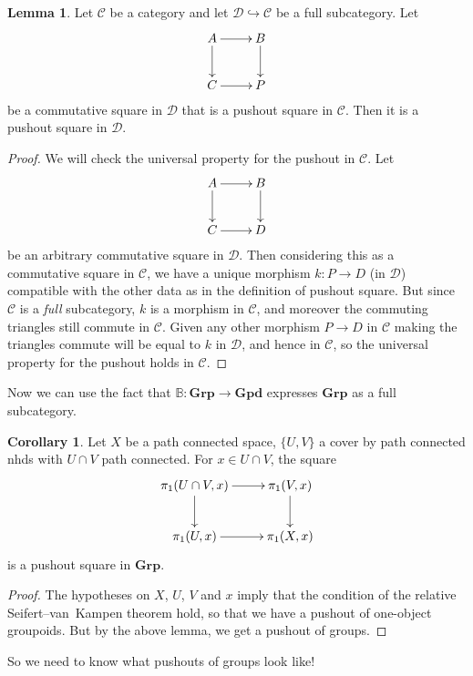\documentclass{tufte-handout}
\def\into {\hookrightarrow}
\def\cC {\mathcal{C}}
\def\cD {\mathcal{D}}
\def\Grp {\mathbf{Grp}}
\def\Gpd {\mathbf{Gpd}}
\theoremstyle{definition}
\newtheorem{lemma}{Lemma}
\newtheorem{corollary}{Corollary}
\begin{document}
\begin{lemma}
Let $\cC$ be a category and let $\cD \into \cC$ be a full subcategory. Let
\[
\xymatrix{
	A\ar[r] \ar[d] & B \ar[d]\\
	C \ar[r] & P
}
\]
be a commutative square in $\cD$ that is a pushout square in $\cC$. Then it is a pushout
square in $\cD$.
\end{lemma}

\begin{proof}
We will check the universal property for the pushout in $\cC$. Let
\[
\xymatrix{
	A\ar[r] \ar[d] & B \ar[d] \\
	C \ar[r] & D
}
\]
be an arbitrary commutative square in $\cD$. Then considering this as a commutative 
square in $\cC$, we have a unique morphism $k\colon P\to D$ (in $\cD$) compatible with 
the other data as in the definition of pushout square. But since $\cC$ is a \emph{full} 
subcategory, $k$ is a morphism in $\cC$, and moreover the commuting triangles still 
commute in $\cC$. Given any other morphism $P\to D$ in $\cC$ making the triangles commute will
be equal to $k$ in $\cD$, and hence in $\cC$, so the universal property for the pushout
holds in $\cC$.
\end{proof}

Now we can use the fact that $\mathbb{B}\colon \Grp \to \Gpd$ expresses $\Grp$ as a full 
subcategory.

\begin{corollary}
Let $X$ be a path connected space, $\{U,V\}$ a cover by path connected nhds with 
$U\cap V$ path connected. For $x\in U\cap V$, the square
\[
\xymatrix{
	\pi_1(U\cap V,x) \ar[r] \ar[d] & \pi_1(V,x) \ar[d]\\
	\pi_1(U,x) \ar[r] & \pi_1(X,x)
}
\]
is a pushout square in $\Grp$.
\end{corollary}

\begin{proof}
The hypotheses on $X$, $U$, $V$ and $x$ imply that the condition of the relative 
Seifert--van~Kampen theorem hold, so that we have a pushout of one-object groupoids. But 
by the above lemma, we get a pushout of groups.
\end{proof}

So we need to know what pushouts of groups look like!
\end{document}
